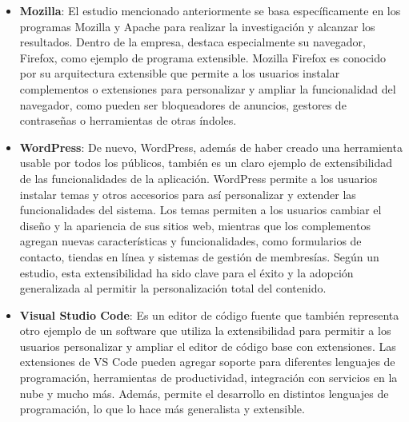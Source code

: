 \begin{itemize}
	
	\item \textbf{Mozilla}: El estudio mencionado anteriormente  \citep{mockus2002two} se basa específicamente en los programas Mozilla y Apache para realizar la investigación y alcanzar los resultados. Dentro de la empresa, destaca especialmente su navegador, Firefox, como ejemplo de programa extensible. Mozilla Firefox es conocido por su arquitectura extensible que permite a los usuarios instalar complementos o extensiones para personalizar y ampliar la funcionalidad del navegador, como pueden ser bloqueadores de anuncios, gestores de contraseñas o herramientas de otras índoles.
	
	\item \textbf{WordPress}: De nuevo, WordPress, además de haber creado una herramienta usable por todos los públicos, también es un claro ejemplo de extensibilidad de las funcionalidades de la aplicación. WordPress permite a los usuarios instalar temas y otros accesorios para así personalizar y extender las funcionalidades del sistema. Los temas permiten a los usuarios cambiar el diseño y la apariencia de sus sitios web, mientras que los complementos agregan nuevas características y funcionalidades, como formularios de contacto, tiendas en línea y sistemas de gestión de membresías. Según un estudio, esta extensibilidad ha sido clave para el éxito y la adopción generalizada al permitir la personalización total del contenido.
	
	\item \textbf{Visual Studio Code}: Es un editor de código fuente que también representa otro ejemplo de un software que utiliza la extensibilidad para permitir a los usuarios personalizar y ampliar el editor de código base con extensiones. Las extensiones de VS Code pueden agregar soporte para diferentes lenguajes de programación, herramientas de productividad, integración con servicios en la nube y mucho más. Además, permite el desarrollo en distintos lenguajes de programación, lo que lo hace más generalista y extensible.
	
	
\end{itemize}

